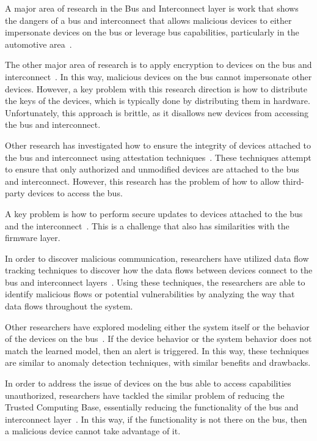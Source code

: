 \documentclass[11pt,letterpaper]{article}
\begin{document}
A major area of research in the Bus and Interconnect layer is work
that shows the dangers of a bus and interconnect that allows malicious
devices to either impersonate devices on the bus or leverage bus
capabilities, particularly in the automotive area~\cite{Bonkoski2013,
  Checkoway2011, Hoppe2008, Koscher2010, Rouf2010, Sang2010}.

The other major area of research is to apply encryption to devices on
the bus and interconnect~\cite{Groza2012, Herrewege2011, Jiang2012,
  Schweppe2011, Stewin2014, Szilagyi2010}. In this way, malicious
devices on the bus cannot impersonate other devices. However, a key
problem with this research direction is how to distribute the keys of
the devices, which is typically done by distributing them in hardware.
Unfortunately, this approach is brittle, as it disallows new devices
from accessing the bus and interconnect.

Other research has investigated how to ensure the integrity of devices
attached to the bus and interconnect using attestation
techniques~\cite{Li2010, Li2011}. These techniques attempt to ensure
that only authorized and unmodified devices are attached to the bus
and interconnect. However, this research has the problem of how to
allow third-party devices to access the bus.

A key problem is how to perform secure updates to devices attached to
the bus and the interconnect~\cite{Larson2008}. This is a challenge
that also has similarities with the firmware layer.

In order to discover malicious communication, researchers have
utilized data flow tracking techniques to discover how the data flows
between devices connect to the bus and interconnect
layers~\cite{Schweppe2012}. Using these techniques, the researchers
are able to identify malicious flows or potential vulnerabilities by
analyzing the way that data flows throughout the system.

Other researchers have explored modeling either the system itself
or the behavior of the devices on the bus~\cite{Stewin2013a,
  Drolia2011}. If the device behavior or the system behavior does not
match the learned model, then an alert is triggered. In this way,
these techniques are similar to anomaly detection techniques, with
similar benefits and drawbacks. 

In order to address the issue of devices on the bus able to access
capabilities unauthorized, researchers have tackled the similar
problem of reducing the Trusted Computing Base, essentially reducing
the functionality of the bus and interconnect
layer~\cite{Vasudevan2012, Zhang2013, Zhou2009}. In this way, if the
functionality is not there on the bus, then a malicious device cannot
take advantage of it.
\end{document}
